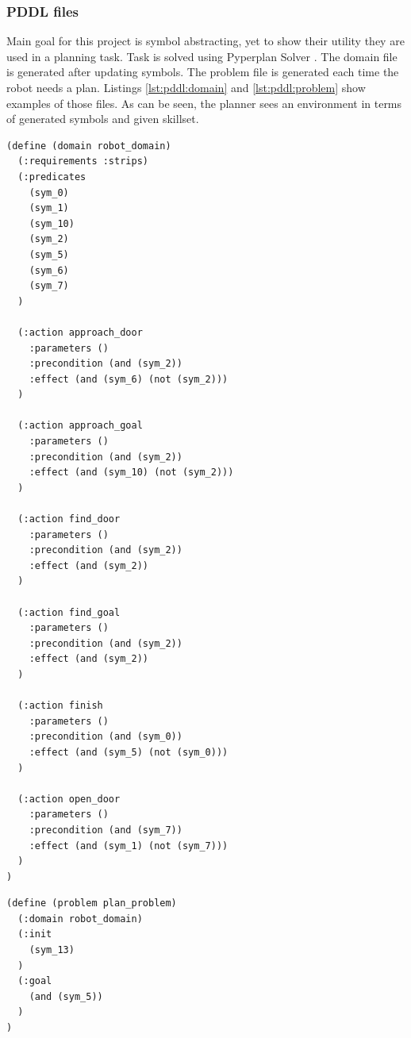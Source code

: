 \subsubsection*{PDDL files} 
Main goal for this project is symbol abstracting, yet to show their utility they are used in a planning task. Task is solved using Pyperplan Solver \parencite{alkhazraji2020pyperplan}. The domain file is generated after updating symbols. The problem file is generated each time the robot needs a plan. Listings \ref{lst:pddl:domain} and \ref{lst:pddl:problem} show examples of those files. As can be seen, the planner sees an environment in terms of generated symbols and given skillset.
\begin{lstlisting}[caption={Domain definition in PDDL}, label={lst:pddl:domain}]
(define (domain robot_domain)
  (:requirements :strips)
  (:predicates
    (sym_0)
    (sym_1)
    (sym_10)
    (sym_2)
    (sym_5)
    (sym_6)
    (sym_7)
  )

  (:action approach_door
    :parameters ()
    :precondition (and (sym_2))
    :effect (and (sym_6) (not (sym_2)))
  )

  (:action approach_goal
    :parameters ()
    :precondition (and (sym_2))
    :effect (and (sym_10) (not (sym_2)))
  )

  (:action find_door
    :parameters ()
    :precondition (and (sym_2))
    :effect (and (sym_2))
  )

  (:action find_goal
    :parameters ()
    :precondition (and (sym_2))
    :effect (and (sym_2))
  )

  (:action finish
    :parameters ()
    :precondition (and (sym_0))
    :effect (and (sym_5) (not (sym_0)))
  )

  (:action open_door
    :parameters ()
    :precondition (and (sym_7))
    :effect (and (sym_1) (not (sym_7)))
  )
)
\end{lstlisting}
\begin{lstlisting}[caption={Problem definition in PDDL}, label={lst:pddl:problem}]
(define (problem plan_problem)
  (:domain robot_domain)
  (:init
    (sym_13)
  )
  (:goal
    (and (sym_5))
  )
)
\end{lstlisting}

